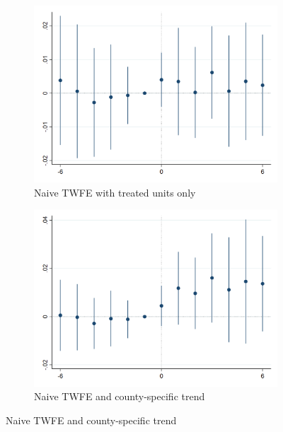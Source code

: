     \begin{figure}[h!] \centering
        \caption{Dynamics around selected minimum wage events}
        \label{fig:event_study_main}
        \begin{subfigure}{0.5\textwidth} \centering
            \includegraphics[width=0.95\linewidth]{analysis/event_study_exploration/output/last_rentpsqft_sfcc_zfe_w6.png}
            \caption{Naive TWFE with treated units only} \label{fig:event_study_treated}
        \end{subfigure}%
        \begin{subfigure}{0.5\textwidth} \centering
            \includegraphics[width=0.95\linewidth]{analysis/event_study_exploration/output/last_rentpsqft_sfcc_zfe_w6_county-trend.png}
            \caption{Naive TWFE and county-specific trend} \label{fig:event_study_treated_county-trends}

\end{subfigure}
\end{figure}
